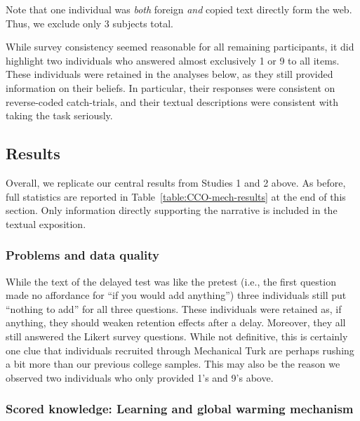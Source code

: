 Note that one individual was \emph{both} foreign \emph{and} copied text directly
form the web. Thus, we exclude only 3 subjects total.

While survey consistency seemed reasonable for all remaining participants, it
did highlight two individuals who answered almost exclusively 1 or 9 to all
items. These individuals were retained in the analyses below, as they still
provided information on their beliefs. In particular, their responses were
consistent on reverse-coded catch-trials, and their textual descriptions were
consistent with taking the task seriously.



\subsection{Results}

Overall, we replicate our central results from Studies 1 and 2 above. As before,
full statistics are reported in Table~\ref{table:CCO-mech-results} at the end of
this section. Only information directly supporting the narrative is included in
the textual exposition.

\subsubsection{Problems and data quality}

While the text of the delayed test was like the pretest (i.e., the first
question made no affordance for “if you would add anything”) three individuals
still put “nothing to add” for all three questions. These individuals were
retained as, if anything, they should weaken retention effects after a delay.
Moreover, they all still answered the Likert survey questions. While not
definitive, this is certainly one clue that individuals recruited through Mechanical
Turk are perhaps rushing a bit more than our previous college samples. This may
also be the reason we observed two individuals who only provided 1's and 9's
above.

\subsubsection{Scored knowledge: Learning and global warming mechanism}

